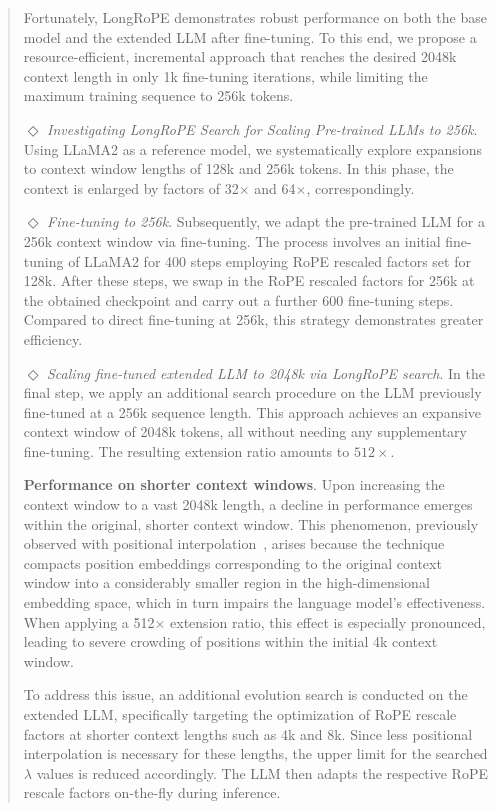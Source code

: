 \begin{abstract}
Fortunately, LongRoPE demonstrates robust performance on both the base model and the extended LLM after fine-tuning. To this end, we propose a resource-efficient, incremental approach that reaches the desired 2048k context length in only 1k fine-tuning iterations, while limiting the maximum training sequence to 256k tokens.

$\Diamond$ \textit{Investigating LongRoPE Search for Scaling Pre-trained LLMs to 256k}. Using LLaMA2 as a reference model, we systematically explore expansions to context window lengths of 128k and 256k tokens. In this phase, the context is enlarged by factors of 32$\times$ and 64$\times$, correspondingly.

$\Diamond$ \textit{Fine-tuning to 256k}. Subsequently, we adapt the pre-trained LLM for a 256k context window via fine-tuning. The process involves an initial fine-tuning of LLaMA2 for 400 steps employing RoPE rescaled factors set for 128k. After these steps, we swap in the RoPE rescaled factors for 256k at the obtained checkpoint and carry out a further 600 fine-tuning steps. Compared to direct fine-tuning at 256k, this strategy demonstrates greater efficiency.

$\Diamond$ \textit{Scaling fine-tuned extended LLM to 2048k via LongRoPE search}. In the final step, we apply an additional search procedure on the LLM previously fine-tuned at a 256k sequence length. This approach achieves an expansive context window of 2048k tokens, all without needing any supplementary fine-tuning. The resulting extension ratio amounts to $512\times$.

\textbf{Performance on shorter context windows}.  Upon increasing the context window to a vast 2048k length, a decline in performance emerges within the original, shorter context window. This phenomenon, previously observed with positional interpolation~\cite{pi}, arises because the technique compacts position embeddings corresponding to the original context window into a considerably smaller region in the high-dimensional embedding space, which in turn impairs the language model's effectiveness. When applying a 512$\times$ extension ratio, this effect is especially pronounced, leading to severe crowding of positions within the initial 4k context window.

To address this issue, an additional evolution search is conducted on the extended LLM, specifically targeting the optimization of RoPE rescale factors at shorter context lengths such as 4k and 8k. Since less positional interpolation is necessary for these lengths, the upper limit for the searched $\lambda$ values is reduced accordingly. The LLM then adapts the respective RoPE rescale factors on-the-fly during inference.


\end{abstract}

